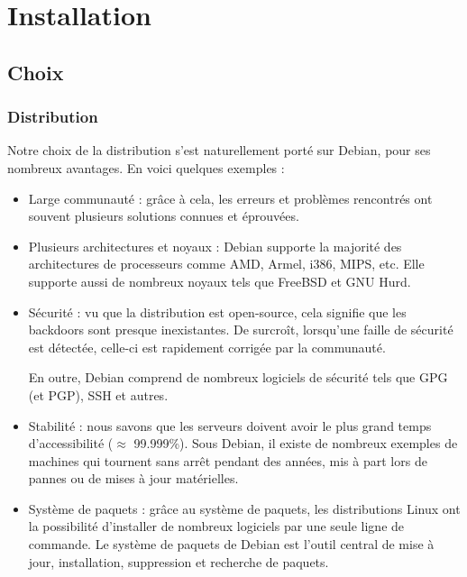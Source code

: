 \chapter*{Installation}
\label{cha:installation}

\section{Choix}
\label{sec:choix}

\subsection{Distribution}
\label{sec:distribution}

Notre choix de la distribution s'est naturellement porté sur Debian, pour ses
nombreux avantages. En voici quelques exemples :

\begin{itemize}
\item Large communauté : grâce à cela, les erreurs et problèmes rencontrés ont
  souvent plusieurs solutions connues et éprouvées.

\item Plusieurs architectures et noyaux : Debian supporte la majorité des
  architectures de processeurs comme AMD, Armel, i386, MIPS, etc. Elle supporte
  aussi de nombreux noyaux tels que FreeBSD et GNU Hurd.

\item Sécurité : vu que la distribution est open-source, cela signifie que les
  backdoors sont presque inexistantes. De surcroît, lorsqu'une faille de sécurité
  est détectée, celle-ci est rapidement corrigée par la communauté.

  En outre, Debian comprend de nombreux logiciels de sécurité tels que GPG (et
  PGP), SSH et autres.

\item Stabilité : nous savons que les serveurs doivent avoir le plus grand temps
d'accessibilité ($\approx$ 99.999\%). Sous Debian, il existe de nombreux exemples de
machines qui tournent sans arrêt pendant des années, mis à part lors de pannes
ou de mises à jour matérielles.

\item Système de paquets : grâce au système de paquets, les distributions Linux
ont la possibilité d'installer de nombreux logiciels par une seule ligne de
commande. Le système de paquets de Debian est l'outil central de mise à jour,
installation, suppression et recherche de paquets.
\end{itemize}

